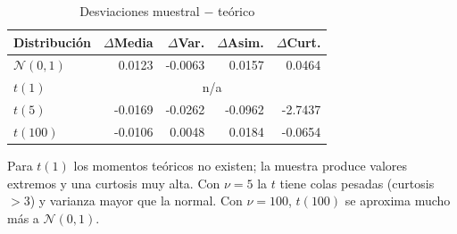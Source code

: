 \documentclass[12pt]{article}
\begin{document}
\begin{itemize}
    \begin{table}[h!]
    \centering
    \caption{Desviaciones muestral $-$ teórico}
    \label{tab:deviations}
    \begin{tabular}{lrrrr}
    \toprule
    Distribución & \(\Delta\)Media & \(\Delta\)Var. & \(\Delta\)Asim. & \(\Delta\)Curt. \\
    \midrule
    \(\mathcal N(0,1)\) &  0.0123 & -0.0063 &  0.0157 &  0.0464 \\
    \(t(1)\)            &    \multicolumn{4}{c}{n/a} \\
    \(t(5)\)            & -0.0169 & -0.0262 & -0.0962 & -2.7437 \\
    \(t(100)\)          & -0.0106 &  0.0048 &  0.0184 & -0.0654 \\
    \bottomrule
    \end{tabular}
    \end{table}
    

    Para \(t(1)\) los momentos teóricos no existen; la muestra produce valores extremos y una curtosis muy alta. Con \(\nu=5\) la \(t\) tiene colas pesadas (curtosis \(>3\))
    y varianza mayor que la normal. Con \(\nu=100\), \(t(100)\) se aproxima mucho más a \(\mathcal N(0,1)\).
    

\end{itemize}
\end{document}
